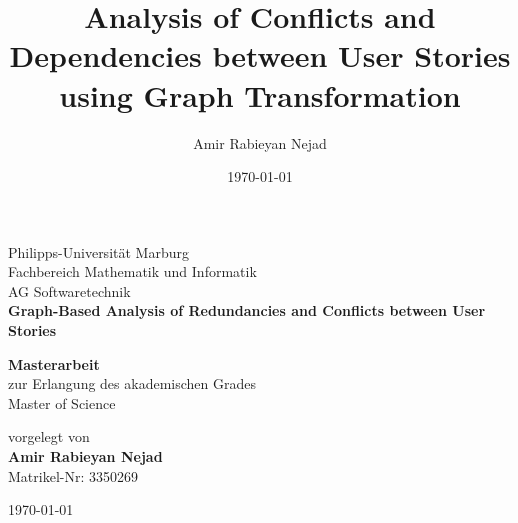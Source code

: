 \documentclass[11pt,a4paper]{article}
\title{Analysis of Conflicts and Dependencies between User Stories using Graph Transformation}
\author{Amir Rabieyan Nejad}
\date{\today}
\numberwithin{equation}{section}
\begin{document}
\begin{titlepage}
    \begin{center}
        \vspace*{1cm}
        \Large
        Philipps-Universität Marburg\\
        Fachbereich Mathematik und Informatik\\
        AG Softwaretechnik \\
        \vspace*{1cm}
        \Large
        \textbf{Graph-Based Analysis of Redundancies and Conflicts between User Stories}
            
      
        \vspace{1.5cm}
            
        \textbf{Masterarbeit}\\
        zur Erlangung des akademischen Grades \\
        Master of Science
        
        \vspace{1.5cm}
        vorgelegt von\\
        \textbf{Amir Rabieyan Nejad}\\
        Matrikel-Nr: 3350269
            
    
            
        \vspace{1.5cm}
            
        
            
        
        
        \today\\
        
    \end{center}
\end{titlepage}
\pagestyle{empty}
\newpage\null\newpage

\newpage\null\newpage


\newpage
\pagestyle{plain}
\tableofcontents
\newpage\null\newpage












\newpage



   
\end{document}
